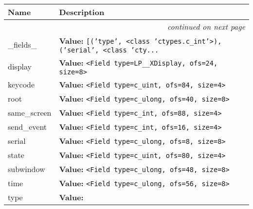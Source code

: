     \vspace{-1cm}
\hspace{\varindent}\begin{longtable}{|p{\varnamewidth}|p{\vardescrwidth}|l}
\cline{1-2}
\cline{1-2} \centering \textbf{Name} & \centering \textbf{Description}& \\
\cline{1-2}
\endhead\cline{1-2}\multicolumn{3}{r}{\small\textit{continued on next page}}\\\endfoot\cline{1-2}
\endlastfoot\raggedright \_\-f\-i\-e\-l\-d\-s\-\_\- & \raggedright \textbf{Value:} 
{\tt \texttt{[}\texttt{(}\texttt{'}\texttt{type}\texttt{'}\texttt{, }{\textless}class 'ctypes.c\_int'{\textgreater}\texttt{)}\texttt{, }\texttt{(}\texttt{'}\texttt{serial}\texttt{'}\texttt{, }{\textless}class 'cty\texttt{...}}&\\
\cline{1-2}
\raggedright d\-i\-s\-p\-l\-a\-y\- & \raggedright \textbf{Value:} 
{\tt {\textless}Field type=LP\_\_XDisplay, ofs=24, size=8{\textgreater}}&\\
\cline{1-2}
\raggedright k\-e\-y\-c\-o\-d\-e\- & \raggedright \textbf{Value:} 
{\tt {\textless}Field type=c\_uint, ofs=84, size=4{\textgreater}}&\\
\cline{1-2}
\raggedright r\-o\-o\-t\- & \raggedright \textbf{Value:} 
{\tt {\textless}Field type=c\_ulong, ofs=40, size=8{\textgreater}}&\\
\cline{1-2}
\raggedright s\-a\-m\-e\-\_\-s\-c\-r\-e\-e\-n\- & \raggedright \textbf{Value:} 
{\tt {\textless}Field type=c\_int, ofs=88, size=4{\textgreater}}&\\
\cline{1-2}
\raggedright s\-e\-n\-d\-\_\-e\-v\-e\-n\-t\- & \raggedright \textbf{Value:} 
{\tt {\textless}Field type=c\_int, ofs=16, size=4{\textgreater}}&\\
\cline{1-2}
\raggedright s\-e\-r\-i\-a\-l\- & \raggedright \textbf{Value:} 
{\tt {\textless}Field type=c\_ulong, ofs=8, size=8{\textgreater}}&\\
\cline{1-2}
\raggedright s\-t\-a\-t\-e\- & \raggedright \textbf{Value:} 
{\tt {\textless}Field type=c\_uint, ofs=80, size=4{\textgreater}}&\\
\cline{1-2}
\raggedright s\-u\-b\-w\-i\-n\-d\-o\-w\- & \raggedright \textbf{Value:} 
{\tt {\textless}Field type=c\_ulong, ofs=48, size=8{\textgreater}}&\\
\cline{1-2}
\raggedright t\-i\-m\-e\- & \raggedright \textbf{Value:} 
{\tt {\textless}Field type=c\_ulong, ofs=56, size=8{\textgreater}}&\\
\cline{1-2}
\raggedright t\-y\-p\-e\- & \raggedright \textbf{Value:} 

\end{longtable}
